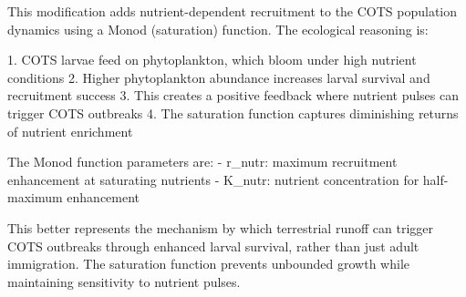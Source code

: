 This modification adds nutrient-dependent recruitment to the COTS population dynamics using a Monod (saturation) function. The ecological reasoning is:

1. COTS larvae feed on phytoplankton, which bloom under high nutrient conditions
2. Higher phytoplankton abundance increases larval survival and recruitment success
3. This creates a positive feedback where nutrient pulses can trigger COTS outbreaks
4. The saturation function captures diminishing returns of nutrient enrichment

The Monod function parameters are:
- r_nutr: maximum recruitment enhancement at saturating nutrients
- K_nutr: nutrient concentration for half-maximum enhancement

This better represents the mechanism by which terrestrial runoff can trigger COTS outbreaks through enhanced larval survival, rather than just adult immigration. The saturation function prevents unbounded growth while maintaining sensitivity to nutrient pulses.
